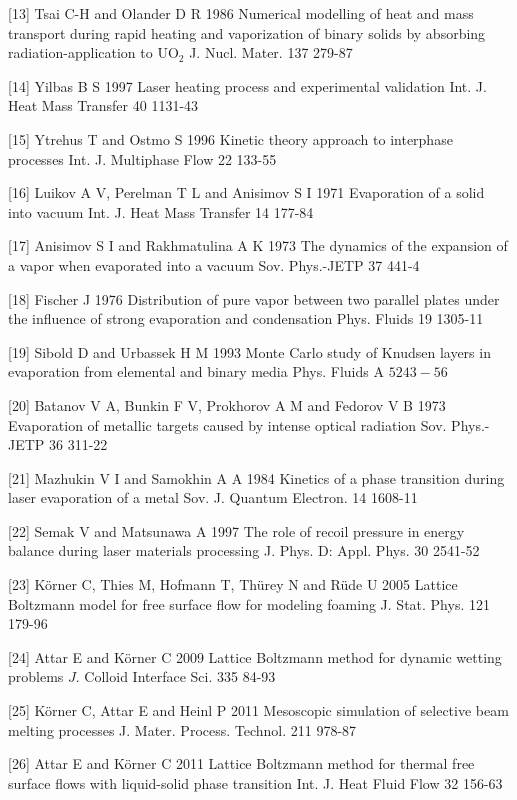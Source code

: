 \documentclass[10pt]{article}
\begin{document}
[13] Tsai C-H and Olander D R 1986 Numerical modelling of heat and mass transport during rapid heating and vaporization of binary solids by absorbing radiation-application to $\mathrm{UO}_{2}$ J. Nucl. Mater. 137 279-87

[14] Yilbas B S 1997 Laser heating process and experimental validation Int. J. Heat Mass Transfer 40 1131-43

[15] Ytrehus T and Ostmo S 1996 Kinetic theory approach to interphase processes Int. J. Multiphase Flow 22 133-55

[16] Luikov A V, Perelman T L and Anisimov S I 1971 Evaporation of a solid into vacuum Int. J. Heat Mass Transfer 14 177-84

[17] Anisimov S I and Rakhmatulina A K 1973 The dynamics of the expansion of a vapor when evaporated into a vacuum Sov. Phys.-JETP 37 441-4

[18] Fischer J 1976 Distribution of pure vapor between two parallel plates under the influence of strong evaporation and condensation Phys. Fluids 19 1305-11

[19] Sibold D and Urbassek H M 1993 Monte Carlo study of Knudsen layers in evaporation from elemental and binary media Phys. Fluids A $5243-56$

[20] Batanov V A, Bunkin F V, Prokhorov A M and Fedorov V B 1973 Evaporation of metallic targets caused by intense optical radiation Sov. Phys.-JETP 36 311-22

[21] Mazhukin V I and Samokhin A A 1984 Kinetics of a phase transition during laser evaporation of a metal Sov. J. Quantum Electron. 14 1608-11

[22] Semak V and Matsunawa A 1997 The role of recoil pressure in energy balance during laser materials processing J. Phys. D: Appl. Phys. 30 2541-52

[23] Körner C, Thies M, Hofmann T, Thürey N and Rüde U 2005 Lattice Boltzmann model for free surface flow for modeling foaming J. Stat. Phys. 121 179-96

[24] Attar E and Körner C 2009 Lattice Boltzmann method for dynamic wetting problems $J$. Colloid Interface Sci. 335 84-93

[25] Körner C, Attar E and Heinl P 2011 Mesoscopic simulation of selective beam melting processes J. Mater. Process. Technol. 211 978-87

[26] Attar E and Körner C 2011 Lattice Boltzmann method for thermal free surface flows with liquid-solid phase transition Int. J. Heat Fluid Flow 32 156-63
\end{document}
